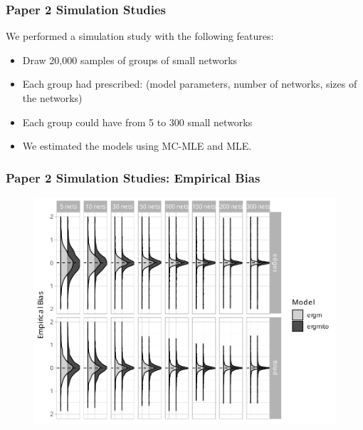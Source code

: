\documentclass[aspectratio=169, 9pt]{beamer}
\begin{document}
\begin{frame}[label=ergmitodgp]
\frametitle{Paper 2 Simulation Studies}

We performed a simulation study with the following features:

\begin{itemize}%
\item Draw 20,000 samples of groups of small networks
\item Each group had prescribed: (model parameters, number of networks, sizes of the networks)
\item Each group could have from 5 to 300 small networks
\item We estimated the models using MC-MLE and MLE.
\end{itemize}

\vfill\hfill\hyperlink{ergmitoexample}{}

\end{frame}



\begin{frame}[label=ergmito-bias]
\frametitle{Paper 2 Simulation Studies: Empirical Bias}

\begin{figure}
\centering
\includegraphics[width=.6\linewidth]{bias-02-various-sizes-4-5-ttriad.pdf}
\end{figure}


\end{frame}
\end{document}
